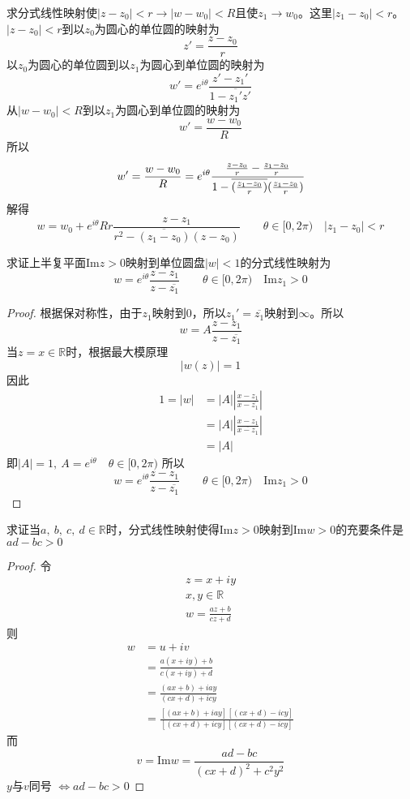 \begin{homeworkProblem}
求分式线性映射使$|z-z_0|<r\longrightarrow|w-w_0|<R$且使$z_1\rightarrow w_0$。这里$|z_1-z_0|<r$。
\newline
\solution
$|z-z_0|<r$到以$z_0$为圆心的单位圆的映射为
\[
z' = \frac{z-z_0}{r}
\]
以$z_0$为圆心的单位圆到以$z_1$为圆心到单位圆的映射为
\[
w' = e^{i\theta}\frac{z'-z_1'}{1-\overline{z_1'}z'}
\]
从$|w-w_0|<R$到以$z_1$为圆心到单位圆的映射为
\[
w' = \frac{w-w_0}{R}
\]
所以
\[
w' = \frac{w-w_0}{R} = e^{i\theta}\cfrac{\frac{z-z_0}{r} - \frac{z_1-z_0}{r}}
{1 - \overline{(\frac{z_1-z_0}{r})}(\frac{z_1-z_0}{r})}
\]
解得
\[
w = w_0 + e^{i\theta}Rr\frac{z-z_1}{r^2-\overline{(z_1-z_0)}(z-z_0)} \qquad \theta\in[0,2\pi)\quad|z_1-z_0|<r
\]
\end{homeworkProblem}
\begin{homeworkProblem}
求证上半复平面$\mathrm{Im}z>0$映射到单位圆盘$|w|<1$的分式线性映射为
\[
w = e^{i\theta}\frac{z-z_1}{z-\overline{z_1}}\qquad\theta\in[0,2\pi)\quad\mathrm{Im}z_1>0
\]
\begin{proof}
根据保对称性，由于$z_1$映射到$0$，所以$z_1' = \overline{z_1}$映射到$\infty$。所以
\[w=A\frac{z-z_1}{z-\overline{z_1}}\]
当$z=x\in\mathbb{R}$时，根据最大模原理\[|w(z)| = 1\]
因此
\[
\begin{split}
1 = |w| &= |A|\left|\frac{x-z_1}{x-\overline{z_1}}\right| \\
&= |A|\left|\frac{x-z_1}{\overline{x-z_1}}\right| \\
&= |A|
\end{split}
\]
即$|A|=1,~A=e^{i\theta}\quad\theta\in[0,2\pi)$
所以
\[
w = e^{i\theta}\frac{z-z_1}{z-\overline{z_1}}\qquad\theta\in[0,2\pi)\quad\mathrm{Im}z_1>0
\]
\end{proof}
\end{homeworkProblem}

\begin{homeworkProblem}
    求证当$a,~b,~c,~d\in\mathbb{R}$时，分式线性映射使得$\mathrm{Im}z>0$映射到$\mathrm{Im}w>0$的充要条件是$ad-bc>0$
\begin{proof}
    令
\begin{gather*}
z = x+iy\\
x,y\in\mathbb{R}\\
w=\frac{az+b}{cz+d}
\end{gather*}
则
\[\begin{split}
w &= u+iv \\
&= \frac{a(x+iy)+b}{c(x+iy)+d}\\
&= \frac{(ax+b)+iay}{(cx+d)+icy}\\
&= \frac{[(ax+b)+iay][(cx+d)-icy]}{[(cx+d)+icy][(cx+d)-icy]}
\end{split}\]
而
\[
v = \mathrm{Im}w = \frac{ad-bc}{(cx+d)^2+c^2y^2}
\]
$y$与$v$同号
$
\Leftrightarrow ad-bc>0
$
\end{proof}
\end{homeworkProblem}
\newpage
